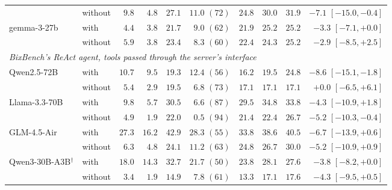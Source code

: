 \documentclass{article}
\begin{document}
\begin{table}[htbp]
\begin{tabular}{llrrrrrrrr}
 & without & $9.8$ & $4.8$ & $27.1$ & $11.0$ $(72)$ & $24.8$ & $30.0$ & $31.9$ & $-7.1$ $[-15.0,-0.4]$\\
gemma-3-27b & with & $4.4$ & $3.8$ & $21.7$ & $9.0$ $(62)$ & $21.9$ & $25.2$ & $25.2$ & $-3.3$ $[-7.1,+0.0]$\\
 & without & $5.9$ & $3.8$ & $23.4$ & $8.3$ $(60)$ & $22.4$ & $24.3$ & $25.2$ & $-2.9$ $[-8.5,+2.5]$\\
\midrule
\multicolumn{10}{l}{\emph{BixBench's ReAct agent, tools passed through the server's interface}}\\
Qwen2.5-72B & with & $10.7$ & $9.5$ & $19.3$ & $12.4$ $(56)$ & $16.2$ & $19.5$ & $24.8$ & $-8.6$ $[-15.1,-1.8]$\\
 & without & $5.4$ & $2.9$ & $19.5$ & $6.8$ $(73)$ & $17.1$ & $17.1$ & $17.1$ & $+0.0$ $[-6.5,+6.1]$\\
Llama-3.3-70B & with & $9.8$ & $5.7$ & $30.5$ & $6.6$ $(87)$ & $29.5$ & $34.8$ & $33.8$ & $-4.3$ $[-10.9,+1.8]$\\
 & without & $4.9$ & $1.9$ & $22.0$ & $0.5$ $(94)$ & $21.4$ & $22.4$ & $26.7$ & $-5.2$ $[-10.3,-0.4]$\\
GLM-4.5-Air & with & $27.3$ & $16.2$ & $42.9$ & $28.3$ $(55)$ & $33.8$ & $38.6$ & $40.5$ & $-6.7$ $[-13.9,+0.6]$\\
 & without & $6.3$ & $4.8$ & $24.1$ & $11.2$ $(63)$ & $24.8$ & $26.7$ & $30.0$ & $-5.2$ $[-10.9,+0.9]$\\
Qwen3-30B-A3B$^\dagger$ & with & $18.0$ & $14.3$ & $32.7$ & $21.7$ $(50)$ & $23.8$ & $28.1$ & $27.6$ & $-3.8$ $[-8.2,+0.0]$\\
 & without & $3.4$ & $1.9$ & $14.9$ & $7.8$ $(61)$ & $13.3$ & $17.1$ & $17.6$ & $-4.3$ $[-9.5,+0.5]$\\
\bottomrule
\end{tabular}
\end{table}
\end{document}
